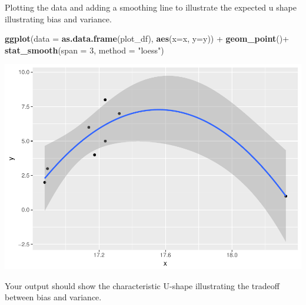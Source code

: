 \documentclass[]{article}
\newenvironment{Shaded}{\begin{snugshade}}{\end{snugshade}}
\newcommand{\KeywordTok}[1]{\textcolor[rgb]{0.13,0.29,0.53}{\textbf{{#1}}}}
\newcommand{\DataTypeTok}[1]{\textcolor[rgb]{0.13,0.29,0.53}{{#1}}}
\newcommand{\DecValTok}[1]{\textcolor[rgb]{0.00,0.00,0.81}{{#1}}}
\newcommand{\StringTok}[1]{\textcolor[rgb]{0.31,0.60,0.02}{{#1}}}
\newcommand{\NormalTok}[1]{{#1}}
\begin{document}
Plotting the data and adding a smoothing line to illustrate the expected
u shape illustrating bias and variance.

\begin{Shaded}
\begin{Highlighting}[]
\KeywordTok{ggplot}\NormalTok{(}\DataTypeTok{data =} \KeywordTok{as.data.frame}\NormalTok{(plot_df), }\KeywordTok{aes}\NormalTok{(}\DataTypeTok{x=}\NormalTok{x, }\DataTypeTok{y=}\NormalTok{y)) +}\StringTok{ }
\StringTok{  }\KeywordTok{geom_point}\NormalTok{()+}
\StringTok{  }\KeywordTok{stat_smooth}\NormalTok{(}\DataTypeTok{span =} \DecValTok{3}\NormalTok{, }\DataTypeTok{method =} \StringTok{"loess"}\NormalTok{)}
\end{Highlighting}
\end{Shaded}

\includegraphics{CHunt_Assign12_files/figure-latex/unnamed-chunk-4-1.pdf}

Your output should show the characteristic U-shape illustrating the
tradeoff between bias and variance.
\end{document}
